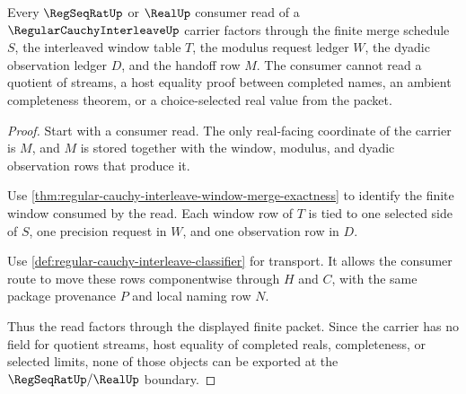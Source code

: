 \begin{theorem}
\label{thm:regular-cauchy-interleave-real-handoff-boundary}
Every $\RegSeqRatUp$ or $\RealUp$ consumer read of a $\RegularCauchyInterleaveUp$ carrier factors through the finite merge schedule $S$, the interleaved window table $T$, the modulus request ledger $W$, the dyadic observation ledger $D$, and the handoff row $M$. The consumer cannot read a quotient of streams, a host equality proof between completed names, an ambient completeness theorem, or a choice-selected real value from the packet.
\end{theorem}
\begin{proof}
Start with a consumer read. The only real-facing coordinate of the carrier is $M$, and $M$ is stored together with the window, modulus, and dyadic observation rows that produce it.

Use \autoref{thm:regular-cauchy-interleave-window-merge-exactness} to identify the finite window consumed by the read. Each window row of $T$ is tied to one selected side of $S$, one precision request in $W$, and one observation row in $D$.

Use \autoref{def:regular-cauchy-interleave-classifier} for transport. It allows the consumer route to move these rows componentwise through $H$ and $C$, with the same package provenance $P$ and local naming row $N$.

Thus the read factors through the displayed finite packet. Since the carrier has no field for quotient streams, host equality of completed reals, completeness, or selected limits, none of those objects can be exported at the $\RegSeqRatUp/\RealUp$ boundary.
\end{proof}

